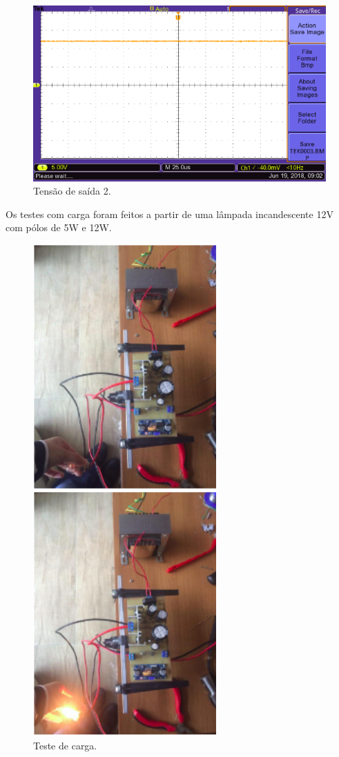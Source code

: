 \begin{figure}[!htb]
	\centering
	\includegraphics[width=14cm]{figuras/tensaoDois.png}
	\caption{Tensão de saída 2.}
	\label{tensaoDois}
\end{figure}

Os testes com carga foram feitos a partir de uma lâmpada incandescente 12V com pólos de 5W e 12W.

\begin{figure}[!htb]
	\centering
	\includegraphics[width=7cm]{figuras/testeCarga.png}
	\caption{Teste de carga.}
	\label{testeCarga}
\end{figure}


